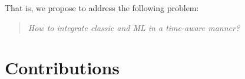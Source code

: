 That is, we propose to address the following problem:
\begin{quote}
    \itshape{How to integrate classic and ML in a time-aware manner?}
\end{quote}
% 
% 
% 

% 


% 
% 
% 
% 


\section{Contributions}

